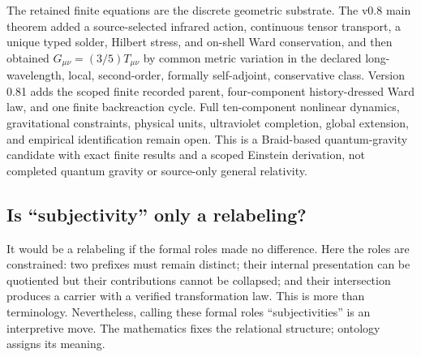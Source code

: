 The retained finite equations are the discrete geometric substrate. The v0.8 main theorem added a source-selected infrared action, continuous tensor transport, a unique typed solder, Hilbert stress, and on-shell Ward conservation, and then obtained $G_{\mu\nu}=(3/5)T_{\mu\nu}$ by common metric variation in the declared long-wavelength, local, second-order, formally self-adjoint, conservative class. Version 0.81 adds the scoped finite recorded parent, four-component history-dressed Ward law, and one finite backreaction cycle. Full ten-component nonlinear dynamics, gravitational constraints, physical units, ultraviolet completion, global extension, and empirical identification remain open. This is a Braid-based quantum-gravity candidate with exact finite results and a scoped Einstein derivation, not completed quantum gravity or source-only general relativity.

\subsection{Is ``subjectivity'' only a relabeling?}

It would be a relabeling if the formal roles made no difference. Here the roles are constrained: two prefixes must remain distinct; their internal presentation can be quotiented but their contributions cannot be collapsed; and their intersection produces a carrier with a verified transformation law. This is more than terminology. Nevertheless, calling these formal roles ``subjectivities'' is an interpretive move. The mathematics fixes the relational structure; ontology assigns its meaning.
